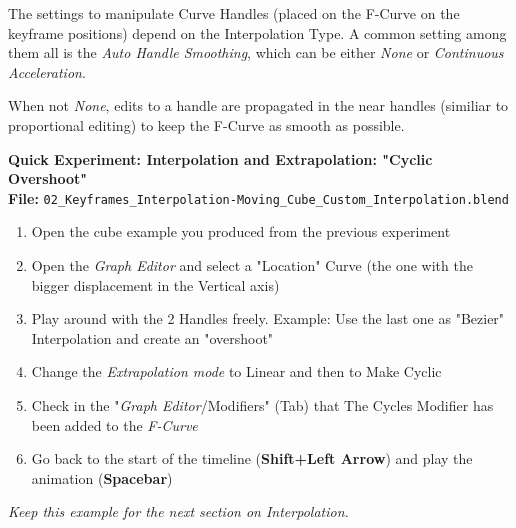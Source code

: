 \documentclass{article}
\begin{document}
The settings to manipulate Curve Handles (placed on the F-Curve on the keyframe positions) depend on the Interpolation Type. A common setting among them all is the
\textit{Auto Handle Smoothing}, which can be either \textit{None} or \textit{Continuous Acceleration}.\par
When not \textit{None}, edits to a handle are propagated in the near handles (similiar to proportional editing) to keep the F-Curve as smooth as possible.
\begin{mdframed}[linewidth=2pt, linecolor=gray, roundcorner=1pt, innermargin=2pt, outermargin=2pt]
    \textbf{\Large Quick Experiment: Interpolation and Extrapolation: "Cyclic Overshoot"} \\[6pt]
    \textbf{File:} \texttt{02\_Keyframes\_Interpolation-Moving\_Cube\_Custom\_Interpolation.blend} \\[6pt]

    \begin{enumerate}[topsep=0pt, noitemsep]
        \item Open the cube example you produced from the previous experiment
        \item Open the \textit{Graph Editor} and select a "Location" Curve (the one with the bigger displacement in the Vertical axis)
        \item Play around with the 2 Handles freely. Example: Use the last one as "Bezier" Interpolation and create an "overshoot"
        \item Change the \textit{Extrapolation mode} to Linear and then to Make Cyclic
        \item Check in the "\textit{Graph Editor}/Modifiers" (Tab) that The Cycles Modifier has been added to the \textit{F-Curve}
        \item Go back to the start of the timeline (\textbf{Shift+Left Arrow}) and play the animation (\textbf{Spacebar})
    \end{enumerate}

    \textit{Keep this example for the next section on Interpolation.}
\end{mdframed}
\end{document}
